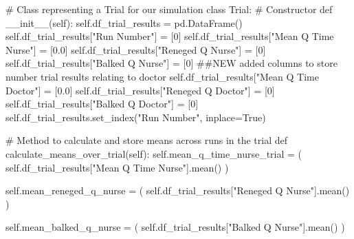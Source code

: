 \documentclass[
  letterpaper,
  DIV=11,
  numbers=noendperiod]{scrreprt}
\newenvironment{Shaded}{\begin{snugshade}}{\end{snugshade}}
\newcommand{\CommentTok}[1]{\textcolor[rgb]{0.37,0.37,0.37}{#1}}
\newcommand{\DecValTok}[1]{\textcolor[rgb]{0.68,0.00,0.00}{#1}}
\newcommand{\FloatTok}[1]{\textcolor[rgb]{0.68,0.00,0.00}{#1}}
\newcommand{\FunctionTok}[1]{\textcolor[rgb]{0.28,0.35,0.67}{#1}}
\newcommand{\KeywordTok}[1]{\textcolor[rgb]{0.00,0.23,0.31}{#1}}
\newcommand{\NormalTok}[1]{\textcolor[rgb]{0.00,0.23,0.31}{#1}}
\newcommand{\OperatorTok}[1]{\textcolor[rgb]{0.37,0.37,0.37}{#1}}
\newcommand{\StringTok}[1]{\textcolor[rgb]{0.13,0.47,0.30}{#1}}
\newcommand{\VariableTok}[1]{\textcolor[rgb]{0.07,0.07,0.07}{#1}}
\begin{document}
\begin{tcolorbox}
\begin{Shaded}
\begin{Highlighting}[]
\CommentTok{\# Class representing a Trial for our simulation}
\KeywordTok{class}\NormalTok{ Trial:}
    \CommentTok{\# Constructor}
    \KeywordTok{def}  \FunctionTok{\_\_init\_\_}\NormalTok{(}\VariableTok{self}\NormalTok{):}
        \VariableTok{self}\NormalTok{.df\_trial\_results }\OperatorTok{=}\NormalTok{ pd.DataFrame()}
        \VariableTok{self}\NormalTok{.df\_trial\_results[}\StringTok{"Run Number"}\NormalTok{] }\OperatorTok{=}\NormalTok{ [}\DecValTok{0}\NormalTok{]}
        \VariableTok{self}\NormalTok{.df\_trial\_results[}\StringTok{"Mean Q Time Nurse"}\NormalTok{] }\OperatorTok{=}\NormalTok{ [}\FloatTok{0.0}\NormalTok{]}
        \VariableTok{self}\NormalTok{.df\_trial\_results[}\StringTok{"Reneged Q Nurse"}\NormalTok{] }\OperatorTok{=}\NormalTok{ [}\DecValTok{0}\NormalTok{]}
        \VariableTok{self}\NormalTok{.df\_trial\_results[}\StringTok{"Balked Q Nurse"}\NormalTok{] }\OperatorTok{=}\NormalTok{ [}\DecValTok{0}\NormalTok{]}
        \CommentTok{\#\#NEW added columns to store number trial results relating to doctor}
        \VariableTok{self}\NormalTok{.df\_trial\_results[}\StringTok{"Mean Q Time Doctor"}\NormalTok{] }\OperatorTok{=}\NormalTok{ [}\FloatTok{0.0}\NormalTok{]}
        \VariableTok{self}\NormalTok{.df\_trial\_results[}\StringTok{"Reneged Q Doctor"}\NormalTok{] }\OperatorTok{=}\NormalTok{ [}\DecValTok{0}\NormalTok{]}
        \VariableTok{self}\NormalTok{.df\_trial\_results[}\StringTok{"Balked Q Doctor"}\NormalTok{] }\OperatorTok{=}\NormalTok{ [}\DecValTok{0}\NormalTok{]}
        \VariableTok{self}\NormalTok{.df\_trial\_results.set\_index(}\StringTok{"Run Number"}\NormalTok{, inplace}\OperatorTok{=}\VariableTok{True}\NormalTok{)}

    \CommentTok{\# Method to calculate and store means across runs in the trial}
    \KeywordTok{def}\NormalTok{ calculate\_means\_over\_trial(}\VariableTok{self}\NormalTok{):}
        \VariableTok{self}\NormalTok{.mean\_q\_time\_nurse\_trial }\OperatorTok{=}\NormalTok{ (}
            \VariableTok{self}\NormalTok{.df\_trial\_results[}\StringTok{"Mean Q Time Nurse"}\NormalTok{].mean()}
\NormalTok{        )}

        \VariableTok{self}\NormalTok{.mean\_reneged\_q\_nurse }\OperatorTok{=}\NormalTok{ (}
            \VariableTok{self}\NormalTok{.df\_trial\_results[}\StringTok{"Reneged Q Nurse"}\NormalTok{].mean()}
\NormalTok{        )}

        \VariableTok{self}\NormalTok{.mean\_balked\_q\_nurse }\OperatorTok{=}\NormalTok{ (}
            \VariableTok{self}\NormalTok{.df\_trial\_results[}\StringTok{"Balked Q Nurse"}\NormalTok{].mean()}
\NormalTok{        )}


\end{Highlighting}
\end{Shaded}
\end{tcolorbox}
\end{document}
